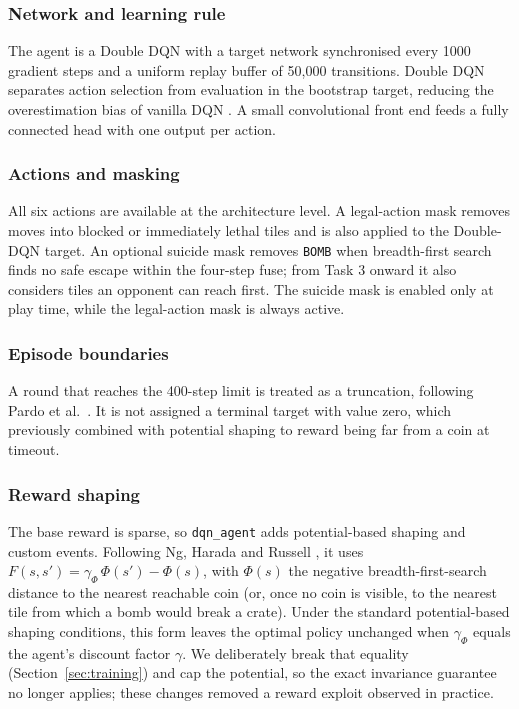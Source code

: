 \documentclass[11pt]{article}
\newcommand{\code}[1]{\texttt{#1}}
\begin{document}
\subsubsection{Network and learning rule}

The agent is a Double DQN \cite{vanhasselt2016} with a target network synchronised every
1000 gradient steps and a uniform replay buffer of 50{,}000 transitions. Double DQN
separates action selection from evaluation in the bootstrap target, reducing the
overestimation bias of vanilla DQN \cite{vanhasselt2016}. A small convolutional front end
feeds a fully connected head with one output per action.

\subsubsection{Actions and masking}

All six actions are available at the architecture level. A legal-action mask removes moves
into blocked or immediately lethal tiles and is also applied to the Double-DQN target. An
optional suicide mask removes \code{BOMB} when breadth-first search finds no safe escape
within the four-step fuse; from Task 3 onward it also considers tiles an opponent can reach
first. The suicide mask is enabled only at play time, while the legal-action mask is always
active.

\subsubsection{Episode boundaries}

A round that reaches the 400-step limit is treated as a truncation, following Pardo et al.\
\cite{pardo2018}. It is not assigned a terminal target with value zero, which previously
combined with potential shaping to reward being far from a coin at timeout.

\subsubsection{Reward shaping}

The base reward is sparse, so \code{dqn\_agent} adds potential-based shaping and custom
events. Following Ng, Harada and Russell \cite{ng1999}, it uses
$F(s,s') = \gamma_\Phi \, \Phi(s') - \Phi(s)$, with $\Phi(s)$ the negative
breadth-first-search distance to the nearest reachable coin (or, once no coin is visible, to
the nearest tile from which a bomb would break a crate). Under the standard potential-based
shaping conditions, this form leaves the optimal policy unchanged when $\gamma_\Phi$ equals
the agent's discount factor $\gamma$. We deliberately break that equality
(Section~\ref{sec:training}) and cap the potential, so the exact invariance guarantee no
longer applies; these changes removed a reward exploit observed in practice.
\end{document}
